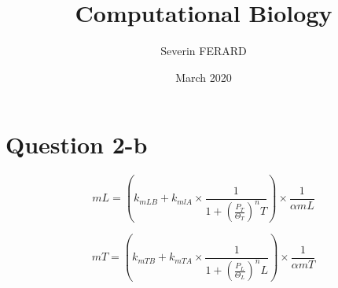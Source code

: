 \documentclass{article}
\title{Computational Biology}
\author{Severin FERARD}
\date{March 2020}
\begin{document}
\maketitle

\section{Question 2-b}

 
\begin{equation} 
{ mL=(k_{mLB}+k_{mlA} \times \frac{1}{1 + (\frac{P_T}{\Theta_T})^nT}) \times \frac{1}{\alpha mL}}
\end{equation}

\begin{equation} 
{ mT=(k_{mTB}+k_{mTA} \times \frac{1}{1 + (\frac{P_L}{\Theta_L})^nL}) \times \frac{1}{\alpha mT}}
\end{equation}
\end{document}
